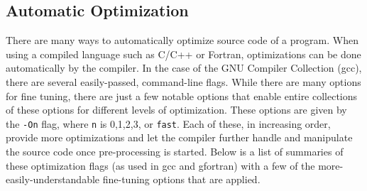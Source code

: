 \documentclass{article}
\begin{document}
\pagebreak
    \subsection{Automatic Optimization}

        There are many ways to automatically optimize source code of a program.  When using a compiled language such as C/C++ or Fortran, optimizations can be done automatically by the compiler.  In the case of the GNU Compiler Collection (gcc), there are several easily-passed, command-line flags.  While there are many options for fine tuning, there are just a few notable options that enable entire collections of these options for different levels of optimization.  These options are given by the \verb|-On| flag, where \verb|n| is 0,1,2,3, or \verb|fast|.  Each of these, in increasing order, provide more optimizations and let the compiler further handle and manipulate the source code once pre-processing is started.  Below is a list of summaries of these optimization flags (as used in gcc and gfortran) with a few of the more-easily-understandable fine-tuning options that are applied.
\end{document}
